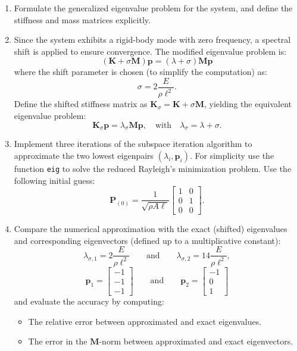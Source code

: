 \documentclass[12pt]{article}
\begin{document}
\begin{enumerate}
  \item[1)] Formulate the generalized eigenvalue problem for the system, and define the stiffness and mass matrices explicitly.

  \item[2)] Since the system exhibits a rigid-body mode with zero frequency, a spectral shift is applied to ensure convergence. The modified eigenvalue problem is:
        \[
          (\mathbf{K} + \sigma \mathbf{M}) \mathbf{p} = (\lambda + \sigma) \mathbf{M} \mathbf{p}
        \]
        where the shift parameter is chosen (to simplify the computation) as:
        \[
          \sigma = 2\frac{E}{\rho \ell^2}.
        \]
        Define the shifted stiffness matrix as $\mathbf{K}_\sigma = \mathbf{K} + \sigma \mathbf{M}$, yielding the equivalent eigenvalue problem:
        \[
          \mathbf{K}_\sigma \mathbf{p} = \lambda_\sigma \mathbf{M} \mathbf{p}, \quad \text{with} \quad \lambda_\sigma = \lambda + \sigma.
        \]

  \item[3)] Implement three iterations of the subspace iteration algorithm to approximate the two lowest eigenpairs $(\lambda_i, \mathbf{p}_i)$. For simplicity use the function \texttt{eig} to solve the reduced Rayleigh's minimization problem. Use the following initial guess:
        \[
          \mathbf{P}_{(0)} = \frac{1}{\sqrt{\rho A \ell}} \begin{bmatrix}
            1 & 0 \\
            0 & 1 \\
            0 & 0
          \end{bmatrix}.
        \]

  \item[4)] Compare the numerical approximation with the exact (shifted) eigenvalues and corresponding eigenvectors (defined up to a multiplicative constant):
        \[
          \lambda_{\sigma,1} = 2\frac{E}{\rho \ell^2}\qquad\text{and}\qquad \lambda_{\sigma,2} = 14\frac{E}{\rho \ell^2},
        \]
        \[
          \mathbf{p}_1 = \begin{bmatrix} -1 \\ -1 \\ -1 \end{bmatrix}\qquad\text{and}\qquad
          \mathbf{p}_2 = \begin{bmatrix} -1 \\ 0 \\ 1 \end{bmatrix}
        \]
        and evaluate the accuracy by computing:
        \begin{itemize}
          \item The relative error between approximated and exact eigenvalues.
          \item The error in the $\mathbf{M}$-norm between approximated and exact eigenvectors.
        \end{itemize}


\end{enumerate}
\end{document}
